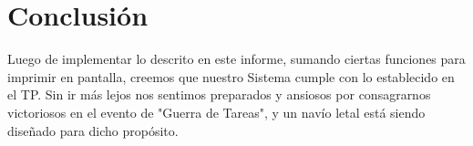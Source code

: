 \section{Conclusión}
\par{Luego de implementar lo descrito en este informe, sumando ciertas funciones para imprimir en pantalla, creemos que nuestro Sistema cumple con lo establecido en el TP. Sin ir más lejos nos sentimos preparados y ansiosos por consagrarnos victoriosos en el evento de "Guerra de Tareas", y un navío letal está siendo diseñado para dicho propósito.}